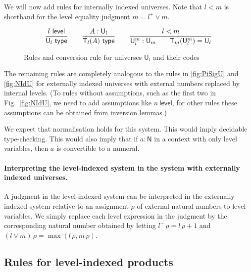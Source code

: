 \documentclass[11pt,a4paper]{article}
\theoremstyle{definition}
\newcommand{\NN}{\mathsf{N}}
\newcommand{\UU}{\mathsf{U}}
\newcommand{\Level}{\mathsf{level}}
\newcommand{\type}{\mathsf{type}}
\newcommand{\T}{\mathsf{T}}
\newcommand{\ua}{\mathsf{ua}}
\newcommand{\UA}{\mathsf{UA}}
\begin{document}
We will now add rules for internally indexed universes.
Note that $l<m$ is shorthand for the level equality judgment
$m= l^+ \vee m$.
\begin{figure}[H]
  \caption{Rules and conversion rule for universes $\UU_l$ and their codes}\label{fig:typeUl}
$$
\frac{l~\Level}{\UU_l~\type}~~~~~~
\frac{A:\UU_{l}}{\T_{l}(A)~\type}~~~~~~
\frac{l<m}{\UU^{m}_{l}:\UU_{m}~~~~~~\T_{m}({\UU^{m}_{l}}) = \UU_{l}}
\belowdisplayshortskip 0pt
$$
\end{figure}

The remaining rules are completely analogous to the rules in
\cref{fig:PiSigU} and \cref{fig:NIdU}
for externally indexed universes with external numbers replaced
by internal levels. (To rules without assumptions, such as the first two
in Fig.~\ref{fig:NIdU}, we need to add assumptions like $n~\Level$,
for other rules these assumptions can be obtained from inversion lemmas.)

 We expect that normalisation holds for this system.
 This would imply decidable type-checking.
 This would also imply that if $a : \NN$ in a context with only
 level variables, then $a$ is convertible to a numeral.


\paragraph{Interpreting the level-indexed system in the system with externally indexed universes.}

A judgment in the level-indexed system can be interpreted in the externally indexed system relative to an assignment $\rho$ of external natural numbers to level variables. We simply replace each level expression in the judgment by the corresponding natural number obtained by letting $l^+\,\rho = l\,\rho+1$ and $(l \vee m)\,\rho = \max(l\,\rho,m\,\rho)$.

\subsection*{Rules for level-indexed products}
\end{document}
